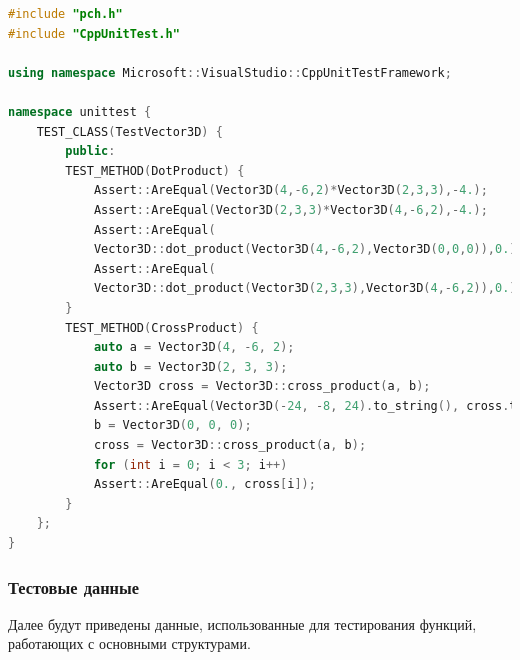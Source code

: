 \begin{lstlisting}[caption={Класс, реализующий тестирование методов для работы с трёхмерным вектором},label={lst:testcode},language=c++]
#include "pch.h"
#include "CppUnitTest.h"

using namespace Microsoft::VisualStudio::CppUnitTestFramework;

namespace unittest {	
	TEST_CLASS(TestVector3D) {
		public:
		TEST_METHOD(DotProduct) {
			Assert::AreEqual(Vector3D(4,-6,2)*Vector3D(2,3,3),-4.);
			Assert::AreEqual(Vector3D(2,3,3)*Vector3D(4,-6,2),-4.);
			Assert::AreEqual(
			Vector3D::dot_product(Vector3D(4,-6,2),Vector3D(0,0,0)),0.);
			Assert::AreEqual(
			Vector3D::dot_product(Vector3D(2,3,3),Vector3D(4,-6,2)),0.);
		}
		TEST_METHOD(CrossProduct) {
			auto a = Vector3D(4, -6, 2);
			auto b = Vector3D(2, 3, 3);
			Vector3D cross = Vector3D::cross_product(a, b);
			Assert::AreEqual(Vector3D(-24, -8, 24).to_string(), cross.to_string());
			b = Vector3D(0, 0, 0);
			cross = Vector3D::cross_product(a, b);
			for (int i = 0; i < 3; i++)
			Assert::AreEqual(0., cross[i]);
		}
	};
}
\end{lstlisting}

\subsubsection{Тестовые данные}
Далее будут приведены данные, использованные для тестирования функций, работающих с основными структурами.

